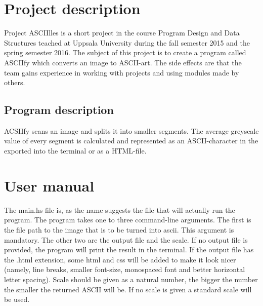 \documentclass[12pt, a4paper]{article}
\begin{document}
\tableofcontents
	
\newpage


	\section{Project description}

		Project ASCIIlles is a short project in the course Program Design and Data Structures teached at Uppsala University during the fall semester 2015 and the spring semester 2016. The subject of this project is to create a program called ASCIIfy which converts an image to ASCII-art. The side effects are that the team gains experience in working with projects and using modules made by others.


		\subsection{Program description }

		ACSIIfy scans an image and splits it into smaller segments. The average greyscale value of every segment is calculated and represented as an ASCII-character in the exported into the terminal or as a HTML-file.


	\section{User manual}

	The main.hs file is, as the name suggests the file that will actually run the program. The program takes one to three command-line arguments. The first is the file path to the image that is to be turned into ascii. This argument is mandatory. The other two are the output file and the scale. If no output file is provided, the program will print the result in the terminal. If the output file has the .html extension, some html and css will be added to make it look nicer (namely, line breaks, smaller font-size, monospaced font and better horizontal letter spacing). Scale should be given as a natural number, the bigger the number the smaller the returned ASCII will be. If no scale is given a standard scale will be used.
		
\end{document}
